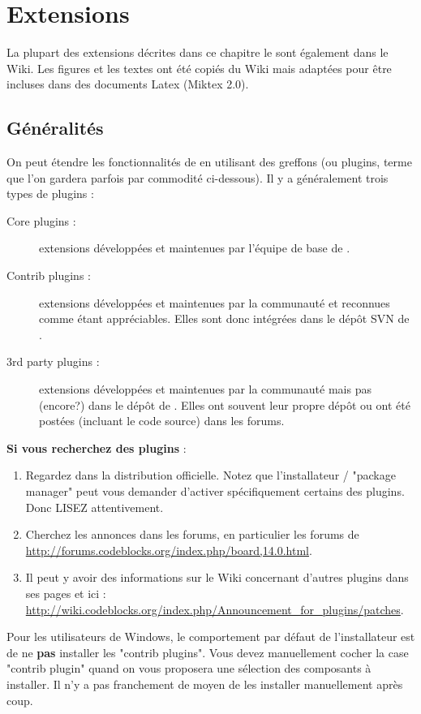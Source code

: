 \chapter{Extensions}\label{sec:plugins}

La plupart des extensions décrites dans ce chapitre le sont également dans le Wiki. Les figures et les textes ont été copiés du Wiki mais adaptées pour être incluses dans des documents Latex (Miktex 2.0). 

\section{Généralités}

On peut étendre les fonctionnalités de \codeblocks en utilisant des greffons (ou plugins, terme que l'on gardera parfois par commodité ci-dessous). Il y a généralement trois types de plugins :
\begin{description}
\item[Core plugins :] extensions développées et maintenues par l'équipe de base de \codeblocks.
\item[Contrib plugins :] extensions développées et maintenues par la communauté et reconnues comme étant appréciables. Elles sont donc intégrées dans le dépôt SVN de \codeblocks.
\item[3rd party plugins :] extensions développées et maintenues par la communauté mais pas (encore?) dans le dépôt de \codeblocks. Elles ont souvent leur propre dépôt ou ont été postées (incluant le code source) dans les forums.
\end{description}

\textbf{Si vous recherchez des plugins} :
\begin{enumerate}
\item Regardez dans la distribution officielle. Notez que l'installateur / "package manager" peut vous demander d'activer spécifiquement certains des plugins. Donc LISEZ attentivement.
\item Cherchez les annonces dans les forums, en particulier les forums de \url{http://forums.codeblocks.org/index.php/board,14.0.html}.
\item Il peut y avoir des informations sur le Wiki concernant d'autres plugins dans ses pages et ici : \url{http://wiki.codeblocks.org/index.php/Announcement_for_plugins/patches}.
\end{enumerate}

Pour les utilisateurs de Windows, le comportement par défaut de l'installateur est de ne \textbf{pas} installer les "contrib plugins". Vous devez manuellement cocher la case "contrib plugin" quand on vous proposera une sélection des composants à installer. Il n'y a pas franchement de moyen de les installer manuellement après coup.


